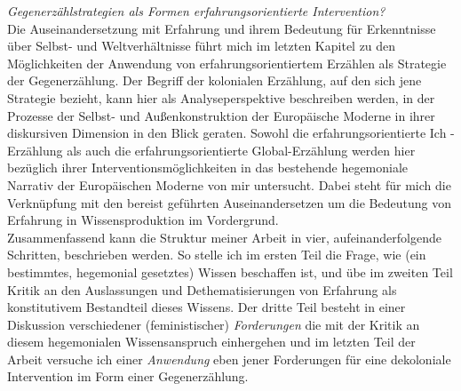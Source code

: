 \noindent\textit{Gegenerzählstrategien als Formen erfahrungsorientierte Intervention?}\\
Die Auseinandersetzung mit Erfahrung und ihrem Bedeutung für Erkenntnisse über
Selbst- und Weltverhältnisse führt mich im letzten Kapitel zu den Möglichkeiten
der Anwendung von erfahrungsorientiertem Erzählen als Strategie der
Gegenerzählung. Der Begriff der kolonialen Erzählung, auf den sich jene
Strategie bezieht, kann hier als Analyseperspektive beschreiben werden, in der
Prozesse der Selbst- und Außenkonstruktion der Europäische Moderne in ihrer
diskursiven Dimension in den Blick geraten. Sowohl die erfahrungsorientierte
Ich - Erzählung als auch die erfahrungsorientierte Global-Erzählung werden hier
bezüglich ihrer Interventionsmöglichkeiten in das bestehende hegemoniale
Narrativ der Europäischen Moderne von mir untersucht. Dabei steht für mich die
Verknüpfung mit den bereist geführten Auseinandersetzen um die Bedeutung von
Erfahrung in Wissensproduktion im Vordergrund.\\

\noindent Zusammenfassend kann die Struktur meiner Arbeit in vier, aufeinanderfolgende
Schritten, beschrieben werden. So stelle ich im ersten Teil die Frage, wie (ein
bestimmtes, hegemonial gesetztes) Wissen beschaffen ist, und übe im zweiten
Teil Kritik an den Auslassungen und Dethematisierungen von Erfahrung als
konstitutivem Bestandteil dieses Wissens. Der dritte Teil besteht in einer Diskussion verschiedener (feministischer)
\textit{Forderungen} die mit der Kritik an diesem hegemonialen Wissensanspruch
einhergehen und im letzten Teil der Arbeit versuche ich einer
\textit{Anwendung} eben
jener Forderungen für eine dekoloniale Intervention im Form einer
Gegenerzählung.

